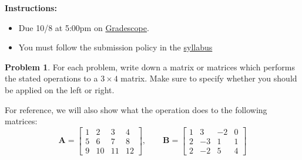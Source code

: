 \documentclass[12pt]{article}
\theoremstyle{definition}
\newtheorem{problem}{Problem}
\renewcommand{\vec}{\mathbf}
\begin{document}
\textbf{\Large{}}
    
    \vspace{-1.8em}
    \hrulefill
 
\textbf{Instructions:}
    \begin{itemize}
        \item Due 10/8 at 5:00pm on \href{https://www.gradescope.com/courses/818054}{Gradescope}.
        \item You must follow the submission policy in the \href{https://courses.chen.pw/na_f2024/syllabus.html}{syllabus} 
\end{itemize}
   
\vspace{.5em}


\begin{problem}
    For each problem, write down a matrix or matrices which performs the stated operations to a $3\times 4$ matrix.
    Make sure to specify whether you should be applied on the left or right.

    For reference, we will also show what the operation does to the following matrices:
    \[
        \vec{A} = 
        \begin{bmatrix}
            1 & 2 & 3 & 4 \\
            5 & 6 & 7 & 8 \\
            9 & 10 & 11 & 12
        \end{bmatrix}
        ,\qquad 
        \vec{B} = 
        \begin{bmatrix}
            1 & 3& -2 & 0 \\
            2 & -3 & 1 & 1 \\
            2 & -2 & 5 & 4
        \end{bmatrix}
    \]


\end{problem}
\end{document}
